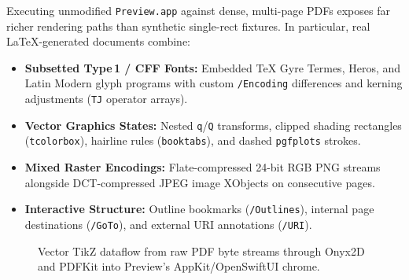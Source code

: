 \documentclass[10pt,twocolumn,letterpaper]{article}
\begin{document}
Executing unmodified \texttt{Preview.app} against dense, multi-page PDFs exposes far richer rendering paths than synthetic single-rect fixtures. In particular, real LaTeX-generated documents combine:
\begin{itemize}[leftmargin=12pt,itemsep=2pt,topsep=3pt]
  \item \textbf{Subsetted Type\,1 / CFF Fonts:} Embedded TeX Gyre Termes, Heros, and Latin Modern glyph programs with custom \texttt{/Encoding} differences and kerning adjustments (\texttt{TJ} operator arrays).
  \item \textbf{Vector Graphics States:} Nested \texttt{q}/\texttt{Q} transforms, clipped shading rectangles (\texttt{tcolorbox}), hairline rules (\texttt{booktabs}), and dashed \texttt{pgfplots} strokes.
  \item \textbf{Mixed Raster Encodings:} Flate-compressed 24-bit RGB PNG streams alongside DCT-compressed JPEG image XObjects on consecutive pages.
  \item \textbf{Interactive Structure:} Outline bookmarks (\texttt{/Outlines}), internal page destinations (\texttt{/GoTo}), and external URI annotations (\texttt{/URI}).
\end{itemize}

\begin{figure}[h]
\centering
{}
\caption{Vector TikZ dataflow from raw PDF byte streams through Onyx2D and PDFKit into Preview's AppKit/OpenSwiftUI chrome.}
\label{fig:tikz-flow}
\end{figure}
\end{document}
